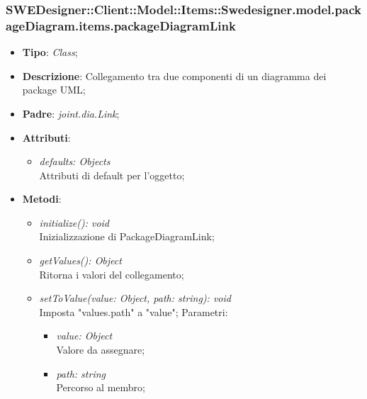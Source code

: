 \documentclass[../DefinizioneDiProdotto.tex]{subfiles}
\begin{document}
			\subsubsection{SWEDesigner::Client::Model::Items::Swedesigner.model.packageDiagram.items.packageDiagramLink}
			\hypertarget{SWEDesigner::Client::Model::Items::Swedesigner.model.packageDiagram.items.packageDiagramLink}{}
			\begin{itemize}
				\item \textbf{Tipo}: \emph{Class};
				\item \textbf{Descrizione}: Collegamento tra due componenti di un diagramma dei package UML;
				\item \textbf{Padre}: \emph{joint.dia.Link};
				\item \textbf{Attributi}:
				\begin{itemize}
					\item \emph{defaults: Objects}\\
					Attributi di default per l'oggetto;
				\end{itemize}
				\item \textbf{Metodi}:
				\begin{itemize}
					\item \emph{initialize(): void}\\
					Inizializzazione di PackageDiagramLink;
					\item \emph{getValues(): Object}\\
					Ritorna i valori del collegamento;
					\item \emph{setToValue(value: Object, path: string): void}\\
					Imposta "values.path" a "value";
					Parametri:
					\begin{itemize}
						\item \emph{value: Object} \\
						Valore da assegnare;
						\item \emph{path: string} \\
						Percorso al membro;
					\end{itemize}
				\end{itemize}
			\end{itemize}
			
\end{document}
